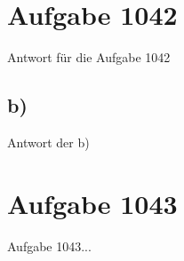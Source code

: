 \documentclass[12pt]{article} %
\begin{document}



\section*{Aufgabe 1042} %

Antwort für die Aufgabe 1042

\subsection*{b)}

Antwort der b)

\section*{Aufgabe 1043}

Aufgabe 1043...

\end{document}
